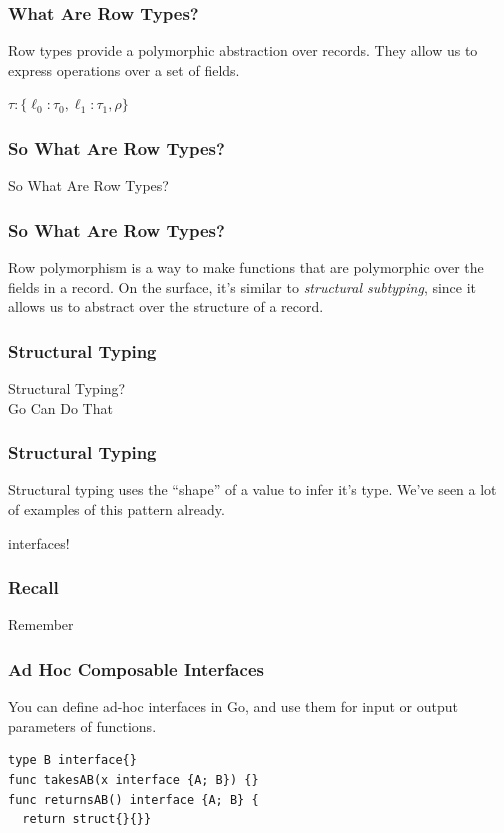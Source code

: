 \documentclass{beamer}
\newcommand{\hugecenter}[1]{\begin{center}\begin{huge}#1\end{huge}\end{center}}
\begin{document}
\begin{frame}[fragile]
  \frametitle{What Are Row Types?}
  Row types provide a polymorphic abstraction over records.  They
  allow us to express operations over a set of fields.
  \pause
  \begin{huge}
    \begin{center}
  \begin{math}
    \tau : \{ \ell_0 : \tau_0, \ell_1 : \tau_1, \rho \}
  \end{math}
\end{center}
\end{huge}
\end{frame}

\begin{frame}
  \frametitle{So What Are Row Types?}
  \hugecenter{So What Are Row Types?}
\end{frame}

\begin{frame}
  \frametitle{So What Are Row Types?}
  Row polymorphism is a way to make functions that are polymorphic
  over the fields in a record.  On the surface, it's similar to {\it
    structural subtyping}, since it allows us to abstract over the
  structure of a record.
\end{frame}

\begin{frame}
  \frametitle{Structural Typing}
  \hugecenter{Structural Typing?\\ Go Can Do That}
\end{frame}

\begin{frame}
  \frametitle{Structural Typing}
  Structural typing uses the ``shape'' of a value to infer it's type.
  We've seen a lot of examples of this pattern already.
  \pause
  \hugecenter{interfaces!}
\end{frame}

\begin{frame}
  \frametitle{Recall}
  \hugecenter{Remember}
\end{frame}

\begin{frame}[fragile]
  \frametitle{Ad Hoc Composable Interfaces}
  You can define ad-hoc interfaces in Go, and use them for input or
  output parameters of functions.
  \pause
\begin{lstlisting}[language=Golang]
% type A interface{}
type B interface{}
func takesAB(x interface {A; B}) {}
func returnsAB() interface {A; B} {
  return struct{}{}}
\end{lstlisting}
\end{frame}
\end{document}
